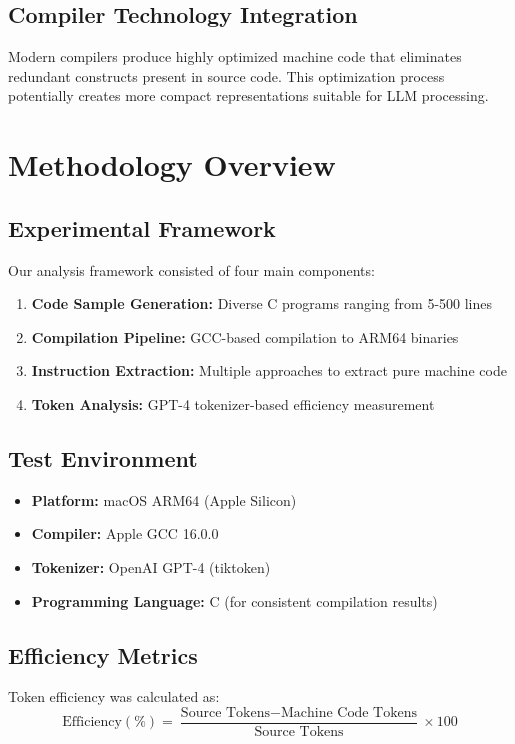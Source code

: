 \documentclass[11pt,a4paper]{article}
\begin{document}
\subsection{Compiler Technology Integration}
Modern compilers produce highly optimized machine code that eliminates redundant constructs present in source code. This optimization process potentially creates more compact representations suitable for LLM processing.

\section{Methodology Overview}

\subsection{Experimental Framework}
Our analysis framework consisted of four main components:

\begin{enumerate}
    \item \textbf{Code Sample Generation:} Diverse C programs ranging from 5-500 lines
    \item \textbf{Compilation Pipeline:} GCC-based compilation to ARM64 binaries
    \item \textbf{Instruction Extraction:} Multiple approaches to extract pure machine code
    \item \textbf{Token Analysis:} GPT-4 tokenizer-based efficiency measurement
\end{enumerate}

\subsection{Test Environment}
\begin{itemize}
    \item \textbf{Platform:} macOS ARM64 (Apple Silicon)
    \item \textbf{Compiler:} Apple GCC 16.0.0
    \item \textbf{Tokenizer:} OpenAI GPT-4 (tiktoken)
    \item \textbf{Programming Language:} C (for consistent compilation results)
\end{itemize}

\subsection{Efficiency Metrics}
Token efficiency was calculated as:
\begin{equation}
\text{Efficiency}(\%) = \frac{\text{Source Tokens} - \text{Machine Code Tokens}}{\text{Source Tokens}} \times 100
\end{equation}
\end{document}
